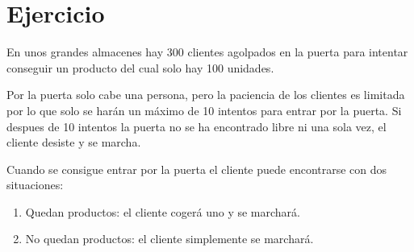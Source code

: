 \documentclass[letterpaper,10pt,spanish]{sphinxmanual}
\begin{document}
\begin{sphinxVerbatim}[commandchars=\\\{\}]
                    
                         
                                \PYG{o}{[}\PYG{o}{]}
                            
                    
                         
                                \PYG{o}{[}\PYG{o}{]}
                            
\end{sphinxVerbatim}


\section{Ejercicio}
\label{\detokenize{textos/tema2:ejercicio}}
En unos grandes almacenes hay 300 clientes agolpados en la puerta para intentar conseguir un producto del cual solo hay 100 unidades.

Por la puerta solo cabe una persona, pero la paciencia de los clientes es limitada por lo que solo se harán un máximo de 10 intentos para entrar por la puerta. Si despues de 10 intentos la puerta no se ha encontrado libre ni una sola vez, el cliente desiste y se marcha.

Cuando se consigue entrar por la puerta el cliente puede encontrarse con dos situaciones:
\begin{enumerate}
\def\theenumi{\arabic{enumi}}
\def\labelenumi{\theenumi .}
\makeatletter\def\p@enumii{\p@enumi \theenumi .}\makeatother
\item {} 
Quedan productos: el cliente cogerá uno y se marchará.

\item {} 
No quedan productos: el cliente simplemente se marchará.

\end{enumerate}
\end{document}

